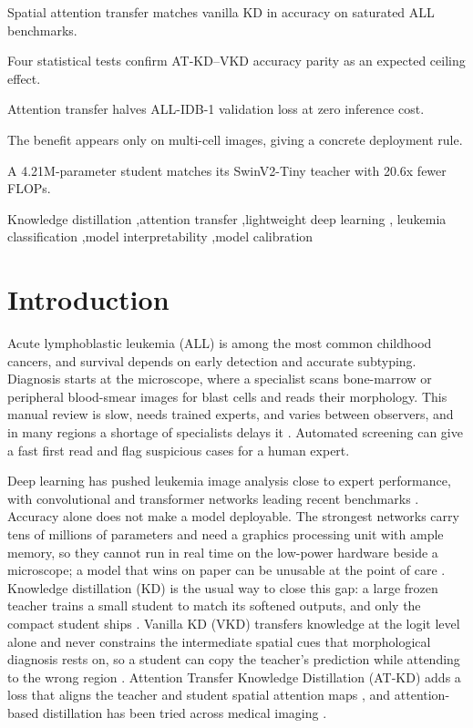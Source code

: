 \documentclass[preprint,review,12pt]{elsarticle}
\begin{document}
\begin{frontmatter}
\begin{highlights}
\item Spatial attention transfer matches vanilla KD in accuracy on saturated ALL benchmarks.
\item Four statistical tests confirm AT-KD--VKD accuracy parity as an expected ceiling effect.
\item Attention transfer halves ALL-IDB-1 validation loss at zero inference cost.
\item The benefit appears only on multi-cell images, giving a concrete deployment rule.
\item A 4.21M-parameter student matches its SwinV2-Tiny teacher with 20.6x fewer FLOPs.
\end{highlights}

\begin{keyword}
Knowledge distillation \sep attention transfer \sep lightweight deep learning \sep
leukemia classification \sep model interpretability \sep model calibration
\end{keyword}

\end{frontmatter}

\section{Introduction}

Acute lymphoblastic leukemia (ALL) is among the most common childhood
cancers, and survival depends on early detection and accurate subtyping.
Diagnosis starts at the microscope, where a specialist scans bone-marrow
or peripheral blood-smear images for blast cells and reads their
morphology. This manual review is slow, needs trained experts, and varies
between observers, and in many regions a shortage of specialists delays
it \cite{ref1,ref2,ref3}. Automated screening can give a fast first read
and flag suspicious cases for a human expert.

Deep learning has pushed leukemia image analysis close to expert
performance, with convolutional and transformer networks leading recent
benchmarks
\cite{ref3,ref4,ref5,ref18,ref19,ref20,ref21,ref22,ref23,ref24,ref25,ref26}.
Accuracy alone does not make a model deployable. The strongest networks
carry tens of millions of parameters and need a graphics processing unit
with ample memory, so they cannot run in real time on the low-power
hardware beside a microscope; a model that wins on paper can be unusable
at the point of care \cite{ref6,ref7,ref27,ref28,ref29,ref30,ref31}.
Knowledge distillation (KD) is the usual way to close this gap: a large
frozen teacher trains a small student to match its softened outputs, and
only the compact student ships \cite{ref8}. Vanilla KD (VKD) transfers
knowledge at the logit level alone and never constrains the intermediate
spatial cues that morphological diagnosis rests on, so a student can copy
the teacher's prediction while attending to the wrong region
\cite{ref9,ref10,ref11,ref32}. Attention Transfer Knowledge Distillation
(AT-KD) adds a loss that aligns the teacher and student spatial attention
maps \cite{ref12}, and attention-based distillation has been tried across
medical imaging
\cite{ref13,ref14,ref15,ref37,ref38,ref39,ref40,ref41,ref42,ref43}.
\end{document}
